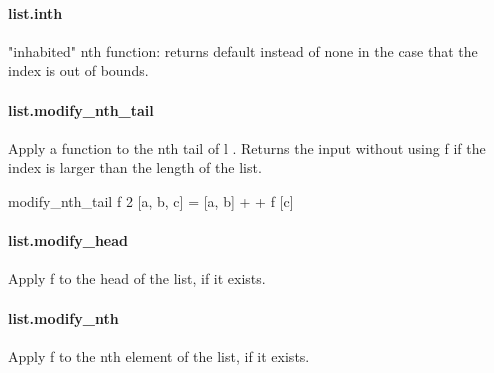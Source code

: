 \documentclass{article}
\begin{document}
\paragraph{list.inth}
\par
"inhabited" 
\colorbox[RGB]{253,246,227}{{{{\color[RGB]{101, 123, 131} nth }}}} function: returns 
\colorbox[RGB]{253,246,227}{{{{\color[RGB]{101, 123, 131} default }}}} instead of 
\colorbox[RGB]{253,246,227}{{{{\color[RGB]{101, 123, 131} none }}}} in the case
that the index is out of bounds.
\paragraph{list.modify\_nth\_tail}
\par
Apply a function to the nth tail of 
\colorbox[RGB]{253,246,227}{{{{\color[RGB]{101, 123, 131} l }}}}. Returns the input without
using 
\colorbox[RGB]{253,246,227}{{{{\color[RGB]{101, 123, 131} f }}}} if the index is larger than the length of the list.
\\
\colorbox[RGB]{253,246,227}{\parbox{4.5in}{{{{\color[RGB]{101, 123, 131} modify\_nth\_tail f  }}}{{{\color[RGB]{108, 113, 196} 2 }}}{{{\color[RGB]{101, 123, 131}  {[}a, b, c{]}  }}}{{{\color[RGB]{181, 137, 0} = }}}{{{\color[RGB]{101, 123, 131}  {[}a, b{]}  }}}{{{\color[RGB]{181, 137, 0} + }}}{{{\color[RGB]{181, 137, 0} + }}}{{{\color[RGB]{101, 123, 131}  f {[}c{]} }}}\\

}}\paragraph{list.modify\_head}
\par
Apply 
\colorbox[RGB]{253,246,227}{{{{\color[RGB]{101, 123, 131} f }}}} to the head of the list, if it exists.
\paragraph{list.modify\_nth}
\par
Apply 
\colorbox[RGB]{253,246,227}{{{{\color[RGB]{101, 123, 131} f }}}} to the nth element of the list, if it exists.
\end{document}
